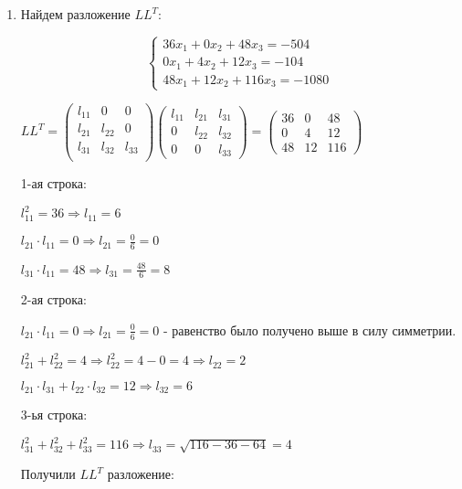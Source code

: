 \documentclass[a4paper,12pt]{article} %
\begin{document}
\begin{enumerate}

\item Найдем разложение $LL^T$:

\begin{equation*}
    \begin{cases}
    36x_1 + 0x_2 + 48x_3 = -504\\
    0x_1 + 4x_2 + 12x_3 = -104\\
    48x_1 + 12x_2 + 116x_3 = -1080
    \end{cases}
\end{equation*}

$
LL^T = \left(\begin{matrix}
l_{11} & 0 & 0\\
l_{21} & l_{22} & 0\\
l_{31} & l_{32} & l_{33}\\
\end{matrix}\right)
\left(\begin{matrix}
l_{11} & l_{21} & l_{31}\\
0 & l_{22} & l_{32}\\
0 & 0 & l_{33}
\end{matrix}\right) =
\left(\begin{matrix}
36 & 0 & 48\\
0 & 4 & 12 \\
48 & 12 & 116
\end{matrix}\right)
$

1-ая строка:

$l_{11}^2 = 36 \Rightarrow l_{11} = 6$

$l_{21} \cdot l_{11} = 0 \Rightarrow l_{21} = \frac{0}{6} = 0$

$l_{31} \cdot l_{11} = 48 \Rightarrow l_{31} = \frac{48}{6} = 8$

2-ая строка:

$l_{21} \cdot l_{11} = 0 \Rightarrow l_{21} = \frac{0}{6} = 0$ - равенство было получено выше в силу симметрии.

$l_{21}^2 + l_{22}^2 = 4 \Rightarrow l_{22}^2 = 4 - 0 = 4 \Rightarrow l_{22} = 2$

$l_{21} \cdot l_{31} + l_{22} \cdot l_{32} = 12 \Rightarrow l_{32} = 6$

3-ья строка:

$l_{31}^2 + l_{32}^2 + l_{33}^2 = 116 \Rightarrow l_{33} = \sqrt{116 - 36 - 64} = 4$

\newpage

Получили $LL^T$ разложение:


\end{enumerate}
\end{document}
